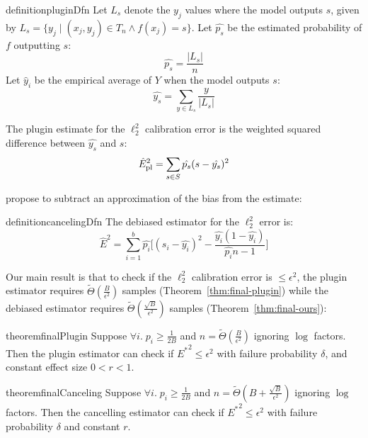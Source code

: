 \begin{restatable}{definition}{pluginDfn}
\label{dfn:plugin-estimator}
  Let $L_s$ denote the $y_j$ values where the model outputs $s$, given by $L_s = \{ y_j \; | \; (x_j, y_j) \in T_n\wedge f(x_j) = s \}$. Let $\hat{p_s}$ be the estimated probability of $f$ outputting $s$:
\[ \hat{p_s} = \frac{|L_s|}{n} \]
Let $\hat y_i$ be the empirical average of $Y$ when the model outputs $s$:
\[ \hat{y_s} = \sum_{y \in L_s} \frac{y}{|L_s|} \] 

  The plugin estimate for the $\ell_2^2$ calibration error is the weighted squared difference between $\hat{y_s}$ and $s$:
\[ \hat{E}_{\textup{pl}}^2{} = \sum_{s \in S} \hat{p_s} (s - \hat{y_s})^2 \]
\end{restatable}

\cite{brocker2012empirical, ferro2012bias} propose to subtract an approximation of the bias from the estimate:

\begin{restatable}{definition}{cancelingDfn}
The debiased estimator for the $\ell_2^2$ error is:
\[ \hat{E}^2 = \sum_{i=1}^b \hat{p_i} \Big[ (s_i - \hat{y_i})^2 - \frac{\hat{y_i}(1 - \hat{y_i})}{\hat{p_i}n-1} \Big] \]
\end{restatable}

Our main result is that to check if the $\ell_2^2$ calibration error is $\leq \epsilon^2$, the plugin estimator requires $\widetilde{\Theta}(\frac{B}{\epsilon^2})$ samples (Theorem~\ref{thm:final-plugin}) while the debiased estimator requires $\widetilde{\Theta}(\frac{\sqrt{B}}{\epsilon^2})$ samples (Theorem~\ref{thm:final-ours}):

\begin{restatable}{theorem}{finalPlugin}
\label{thm:final-plugin}
  Suppose  $\forall i.\;p_i \geq \frac{1}{2B}$ and $n = \widetilde{\Theta}(\frac{B}{\epsilon^2})$ ignoring $\log$ factors. Then the plugin estimator can check if ${E^*}^2 \leq \epsilon^2$ with failure probability $\delta$, and constant effect size $0 < r < 1$. 
\end{restatable}

\begin{restatable}{theorem}{finalCanceling}
\label{thm:final-ours}
Suppose $\forall i.\;p_i \geq \frac{1}{2B}$ and $n = \widetilde{\Theta}(B+\frac{\sqrt{B}}{\epsilon^2})$ ignoring $\log$ factors. Then the cancelling estimator can check if ${E^*}^2 \leq \epsilon^2$ with failure probability $\delta$ and constant $r$. 
\end{restatable}


